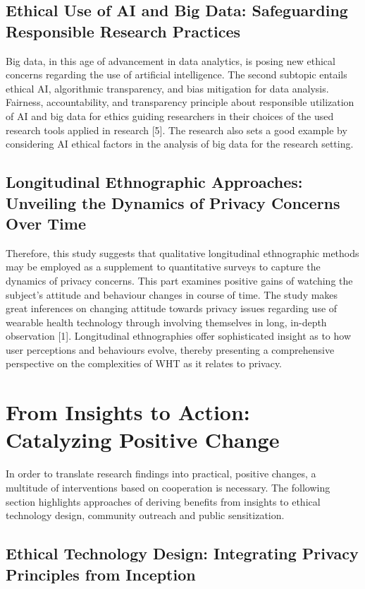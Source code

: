 \documentclass[11pt]{article}
\begin{document}
\subsection{Ethical Use of AI and Big Data: Safeguarding Responsible Research Practices}

Big data, in this age of advancement in data analytics, is posing new ethical concerns regarding the use of artificial intelligence. The second subtopic entails ethical AI, algorithmic transparency, and bias mitigation for data analysis. Fairness, accountability, and transparency principle about responsible utilization of AI and big data for ethics guiding researchers in their choices of the used research tools applied in research [5]. The research also sets a good example by considering AI ethical factors in the analysis of big data for the research setting.

\subsection{Longitudinal Ethnographic Approaches: Unveiling the Dynamics of Privacy Concerns Over Time}

Therefore, this study suggests that qualitative longitudinal ethnographic methods may be employed as a supplement to quantitative surveys to capture the dynamics of privacy concerns. This part examines positive gains of watching the subject’s attitude and behaviour changes in course of time. The study makes great inferences on changing attitude towards privacy issues regarding use of wearable health technology through involving themselves in long, in-depth observation [1]. Longitudinal ethnographies offer sophisticated insight as to how user perceptions and behaviours evolve, thereby presenting a comprehensive perspective on the complexities of WHT as it relates to privacy.

\section{From Insights to Action: Catalyzing Positive Change}

In order to translate research findings into practical, positive changes, a multitude of interventions based on cooperation is necessary. The following section highlights approaches of deriving benefits from insights to ethical technology design, community outreach and public sensitization.

\subsection{Ethical Technology Design: Integrating Privacy Principles from Inception}
\end{document}
